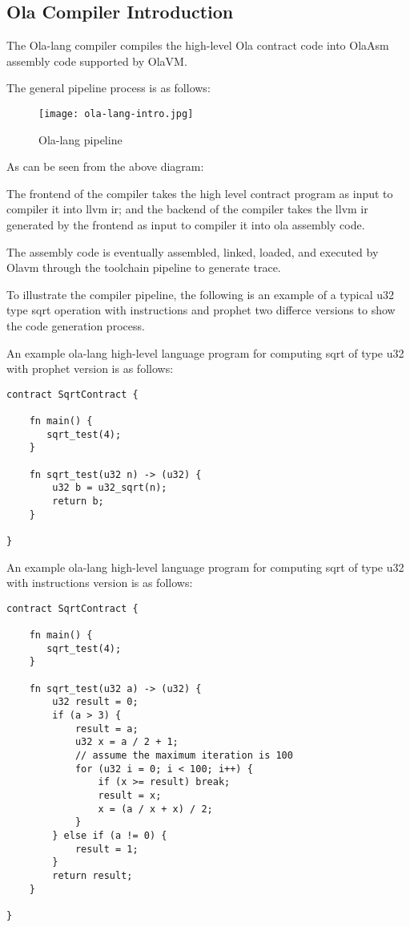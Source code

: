 \subsection{Ola Compiler Introduction}

The Ola-lang compiler compiles the high-level Ola contract code into OlaAsm assembly code supported by OlaVM. 

The general pipeline process is as follows:

\begin{figure}[!htp]
    \centering
    \texttt{[image: ola-lang-intro.jpg]}
    \caption{Ola-lang pipeline}
    \label{fig:ola-lang-intro}
\end{figure}

As can be seen from the above diagram:

The frontend of the compiler takes the high level contract program as input to compiler it into llvm ir;
and the backend of the compiler takes the llvm ir generated by the frontend as input to compiler it into ola assembly code.

The assembly code is eventually assembled, linked, loaded, and executed by Olavm through the toolchain pipeline to generate trace.


To illustrate the compiler pipeline, the following is an example of a typical u32 type sqrt operation with instructions and prophet two differce versions to show the code generation process.

An example ola-lang high-level language program for computing sqrt of type u32 with prophet version is as follows:
\begin{lstlisting}[language={}]
contract SqrtContract {

    fn main() {
       sqrt_test(4);
    }

    fn sqrt_test(u32 n) -> (u32) {
        u32 b = u32_sqrt(n);
        return b;
    }

}
\end{lstlisting}


An example ola-lang high-level language program for computing sqrt of type u32 with instructions version is as follows:
\begin{lstlisting}[language={}]
contract SqrtContract {

    fn main() {
       sqrt_test(4);
    }

    fn sqrt_test(u32 a) -> (u32) {
        u32 result = 0;
        if (a > 3) {
            result = a;
            u32 x = a / 2 + 1;
            // assume the maximum iteration is 100
            for (u32 i = 0; i < 100; i++) {
                if (x >= result) break;
                result = x;
                x = (a / x + x) / 2;
            }
        } else if (a != 0) {
            result = 1;
        }
        return result;
    }

}
\end{lstlisting}
